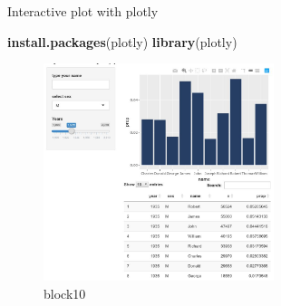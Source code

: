 \documentclass[
  ignorenonframetext,
]{beamer}
\newenvironment{Shaded}{\begin{snugshade}}{\end{snugshade}}
\newcommand{\KeywordTok}[1]{\textcolor[rgb]{0.13,0.29,0.53}{\textbf{#1}}}
\newcommand{\NormalTok}[1]{#1}
\newcommand{\StringTok}[1]{\textcolor[rgb]{0.31,0.60,0.02}{#1}}
\begin{document}
\begin{frame}[fragile]{Interactive plot with plotly}
\protect\hypertarget{interactive-plot-with-plotly}{}

\begin{Shaded}
\begin{Highlighting}[]
  \KeywordTok{install.packages}\NormalTok{(}\StringTok{\textquotesingle{}plotly\textquotesingle{}}\NormalTok{)}
  \KeywordTok{library}\NormalTok{(}\StringTok{\textquotesingle{}plotly\textquotesingle{}}\NormalTok{)}
\end{Highlighting}
\end{Shaded}

\begin{figure}
\centering
\includegraphics[width=0.6\textwidth,height=\textheight]{images/plotly.jpg}
\caption{block10}
\end{figure}

\end{frame}
\end{document}
